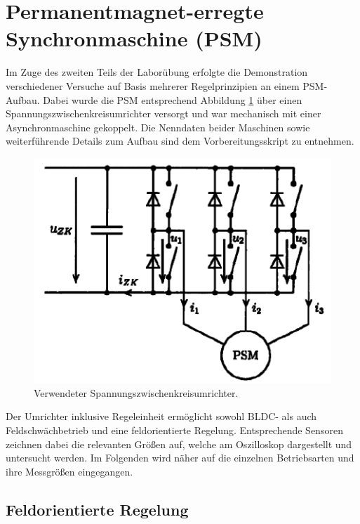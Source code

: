 
\section{Permanentmagnet-erregte Synchronmaschine (PSM)}

Im Zuge des zweiten Teils der Laborübung erfolgte die Demonstration verschiedener Versuche auf Basis mehrerer Regelprinzipien an einem PSM-Aufbau. Dabei wurde die PSM entsprechend Abbildung \ref{fig:umrichter} über einen Spannungszwischenkreisumrichter versorgt und war mechanisch mit einer Asynchronmaschine gekoppelt. Die Nenndaten beider Maschinen sowie weiterführende Details zum Aufbau sind dem Vorbereitungsskript zu entnehmen.

\begin{figure}[h!]
    \centering
    \includegraphics[scale=0.4]{1/Umrichter.png}
    \caption{Verwendeter Spannungszwischenkreisumrichter.}
    \label{fig:umrichter}
\end{figure}

\noindent Der Umrichter inklusive Regeleinheit ermöglicht sowohl BLDC- als auch Feldschwächbetrieb und eine feldorientierte Regelung. Entsprechende Sensoren zeichnen dabei die relevanten Größen auf, welche am Oszilloskop dargestellt und untersucht werden. Im Folgenden wird näher auf die einzelnen Betriebsarten und ihre Messgrößen eingegangen.

\subsection{Feldorientierte Regelung}

